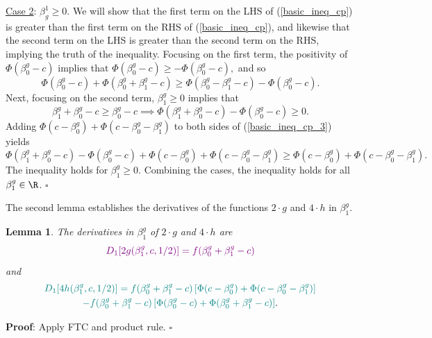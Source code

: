 \documentclass[11pt]{article}
\newtheorem{lemma}{Lemma}
\begin{document}
\begin{appendices}
\begin{refsection}
\noindent
\underline{Case 2}: $\beta^1_g \geq 0.$  We will show that the first term on the LHS of (\ref{basic_ineq_cp}) is greater than the first term on the RHS of (\ref{basic_ineq_cp}), and likewise that the second term on the LHS is greater than the second term on the RHS, implying the truth of the inequality. Focusing on the first term, the positivity of $\Phi(\beta^g_0 -c)$ implies that
$\Phi(\beta^g_0 - c) \geq - \Phi(\beta^g_0 - c),$ and so
$$\Phi(\beta^g_0 - c) + \Phi(\beta^g_0 + \beta^g_1 - c) \geq \Phi(\beta^g_0 - \beta^g_1 - c) - \Phi(\beta^g_0 - c).$$
Next, focusing on the second term, $\beta^g_1 \geq 0$ implies that 
\begin{equation}\label{basic_ineq_cp_3}
\beta^g_1 + \beta^g_0 - c \geq \beta^g_0 - c \implies \Phi(\beta^g_1 + \beta^g_0 - c) - \Phi(\beta^g_0 - c) \geq 0.
\end{equation}
Adding $\Phi(c - \beta^g_0) + \Phi(c - \beta^g_0 - \beta^g_1)$ to both sides of (\ref{basic_ineq_cp_3}) yields
\begin{equation*}
\Phi(\beta^g_1 + \beta^g_0 - c) - \Phi(\beta^g_0 - c) + \Phi(c - \beta^g_0) + \Phi(c - \beta^g_0 - \beta^g_1) \geq \Phi(c - \beta^g_0) + \Phi(c - \beta^g_0 - \beta^g_1). \textrm{ }
\end{equation*}
The inequality holds for $\beta^g_1 \geq 0$. Combining the cases, the inequality holds for all $\beta^g_1 \in \R$. $\square$

The second lemma establishes the derivatives of the functions $2\cdot g$ and $4 \cdot h$ in $\beta^g_1$.
\begin{lemma}
The derivatives in $\beta^g_1$ of $2\cdot g$ and $4\cdot h$ are
\begin{equation}\label{dg_dbeta}
\textcolor{violet}{D_1[2g(\beta^g_1, c, 1/2)] = f(\beta^g_0 + \beta^g_1 - c)}
\end{equation}
and
\begin{multline}\label{dh_dbeta}
\textcolor{teal}{D_1[4h(\beta^g_1, c, 1/2)] = f(\beta^g_0 + \beta^g_1 - c) \left[\Phi(c - \beta^g_0) + \Phi(c - \beta_0^g - \beta_1^g) \right]} \\ \textcolor{teal}{- f(\beta^g_0 + \beta^g_1 - c) \left[\Phi(\beta_0^g - c) + \Phi(\beta^g_0 + \beta^g_1 - c) \right]}.\end{multline}
\end{lemma}
\textbf{Proof}: Apply FTC and product rule. $\square$


\end{refsection}
\end{appendices}
\end{document}
